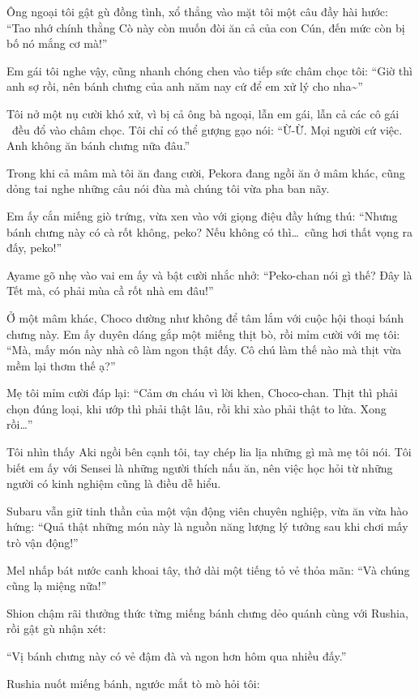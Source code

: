 \documentclass[../main.tex]{subfiles}
\begin{document}
Ông ngoại tôi gật gù đồng tình, xổ thẳng vào mặt tôi một câu đầy hài hước: ``Tao nhớ chính thằng Cò này còn muốn đòi ăn cả của con Cún, đến mức còn bị bố nó mắng cơ mà!''

Em gái tôi nghe vậy, cũng nhanh chóng chen vào tiếp sức châm chọc tôi: ``Giờ thì anh sợ rồi, nên bánh chưng của anh năm nay cứ để em xử lý cho nha\~{}''

Tôi nở một nụ cười khó xử, vì bị cả ông bà ngoại, lẫn em gái, lẫn cả các cô gái \hll\ đều đổ vào châm chọc. Tôi chỉ có thể gượng gạo nói: ``Ừ-Ừ. Mọi người cứ việc. Anh không ăn bánh chưng nữa đâu.''

Trong khi cả mâm mà tôi ăn đang cười, Pekora đang ngồi ăn ở mâm khác, cũng dỏng tai nghe những câu nói đùa mà chúng tôi vừa pha ban nãy.

Em ấy cắn miếng giò trứng, vừa xen vào với giọng điệu đầy hứng thú: ``Nhưng bánh chưng này có cà rốt không, peko? Nếu không có thì\dots\ cũng hơi thất vọng ra đấy, peko!''

Ayame gõ nhẹ vào vai em ấy và bật cười nhắc nhở: ``Peko-chan nói gì thế? Đây là Tết mà, có phải mùa cầ rốt nhà em đâu!''

Ở một mâm khác, Choco dường như không để tâm lắm với cuộc hội thoại bánh chưng này. Em ấy duyên dáng gắp một miếng thịt bò, rồi mỉm cười với mẹ tôi: ``Mà, mấy món này nhà cô làm ngon thật đấy. Cô chú làm thế nào mà thịt vừa mềm lại thơm thế ạ?''

Mẹ tôi mỉm cười đáp lại: ``Cảm ơn cháu vì lời khen, Choco-chan. Thịt thì phải chọn đúng loại, khi ướp thì phải thật lâu, rồi khi xào phải thật to lửa. Xong rồi\dots''

Tôi nhìn thấy Aki ngồi bên cạnh tôi, tay chép lia lịa những gì mà mẹ tôi nói. Tôi biết em ấy với Sensei là những người thích nấu ăn, nên việc học hỏi từ những người có kinh nghiệm cũng là điều dễ hiểu.

Subaru vẫn giữ tinh thần của một vận động viên chuyên nghiệp, vừa ăn vừa hào hứng: ``Quả thật những món này là nguồn năng lượng lý tưởng sau khi chơi mấy trò vận động!''

Mel nhấp bát nước canh khoai tây, thở dài một tiếng tỏ vẻ thỏa mãn: ``Và chúng cũng lạ miệng nữa!''

Shion chậm rãi thưởng thức từng miếng bánh chưng dẻo quánh cùng với Rushia, rồi gật gù nhận xét:

``Vị bánh chưng này có vẻ đậm đà và ngon hơn hôm qua nhiều đấy.''

Rushia nuốt miếng bánh, ngước mắt tò mò hỏi tôi:
\end{document}

